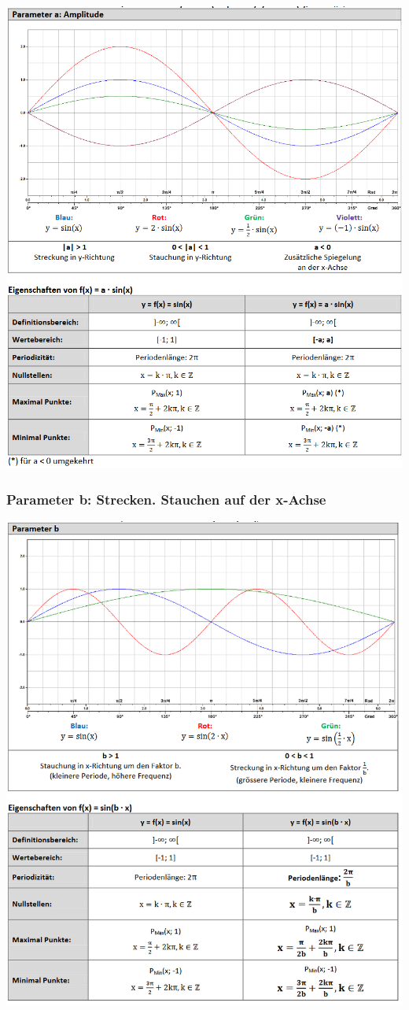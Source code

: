 \includegraphics[scale=0.8]{sinus1.PNG}
\subsubsection{Parameter b: Strecken. Stauchen auf der x-Achse}
\includegraphics[scale=0.8 ]{sinus2.PNG}

